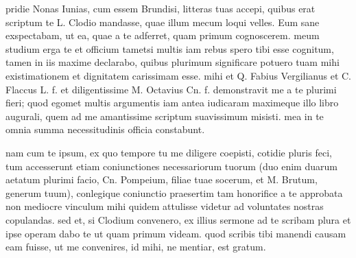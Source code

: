 


 pridie Nonas Iunias, cum essem Brundisi, litteras tuas accepi, quibus erat scriptum te L. Clodio mandasse, quae illum mecum loqui velles. Eum sane exspectabam, ut ea, quae a te adferret, quam primum cognoscerem. meum studium erga te et officium tametsi multis iam rebus spero tibi esse cognitum, tamen in iis maxime declarabo, quibus plurimum significare potuero tuam mihi existimationem et dignitatem carissimam esse. mihi et Q. Fabius Vergilianus et C. Flaccus L. f. et diligentissime M. Octavius Cn. f. demonstravit me a te plurimi fieri; quod egomet multis argumentis iam antea iudicaram maximeque illo libro augurali, quem ad me amantissime scriptum suavissimum misisti. mea in te omnia summa necessitudinis officia constabunt.

 nam cum te ipsum, ex quo tempore tu me diligere coepisti, cotidie pluris feci, tum accesserunt etiam coniunctiones necessariorum tuorum (duo enim duarum aetatum plurimi facio, Cn. Pompeium, filiae tuae socerum, et M. Brutum, generum tuum), conlegique coniunctio praesertim tam honorifice a te approbata non mediocre vinculum mihi quidem attulisse videtur ad voluntates nostras copulandas. sed et, si Clodium convenero, ex illius sermone ad te scribam plura et ipse operam dabo te ut quam primum videam. quod scribis tibi manendi causam eam fuisse, ut me convenires, id mihi, ne mentiar, est gratum.

